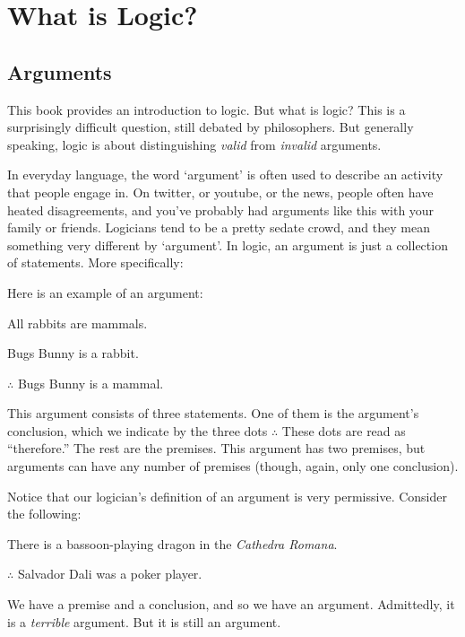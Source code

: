 \chapter{What is Logic?}

\section{Arguments}\label{s:Arguments}


This book provides an introduction to logic.  But what is logic? This is a surprisingly difficult question, still debated by philosophers. But generally speaking, logic is about distinguishing \emph{valid} from \emph{invalid} arguments.

In everyday language, the word `argument' is often used to describe an activity that people engage in.   On twitter, or youtube, or the news, people often have heated disagreements, and you've probably had arguments like this with your family or friends.  Logicians tend to be a pretty sedate crowd, and they mean something very different by `argument'.  In logic, an argument is just a collection of statements.  More specifically:


\noindent Here is an example of an argument:

\begin{earg}
\item[\ex{exarg1}]All rabbits are mammals.
\item[] Bugs Bunny is a rabbit.
\item[] $\therefore$ Bugs Bunny is a mammal.
\end{earg}

This argument consists of three statements.  One of them is the argument's conclusion, which we indicate by the three dots $\therefore$  These dots are read as ``therefore.'' The rest are the premises.  This argument has two premises, but arguments can have any number of premises (though, again, only one conclusion).

Notice that our logician's definition of an argument is very permissive. Consider the following:
	\begin{earg}
		\item[] There is a bassoon-playing dragon in the \emph{Cathedra Romana}.
		\item[] $\therefore$ Salvador Dali was a poker player.
	\end{earg}
We have a premise and a conclusion, and so we have an argument. Admittedly, it is a \emph{terrible} argument. But it is still an argument.  

